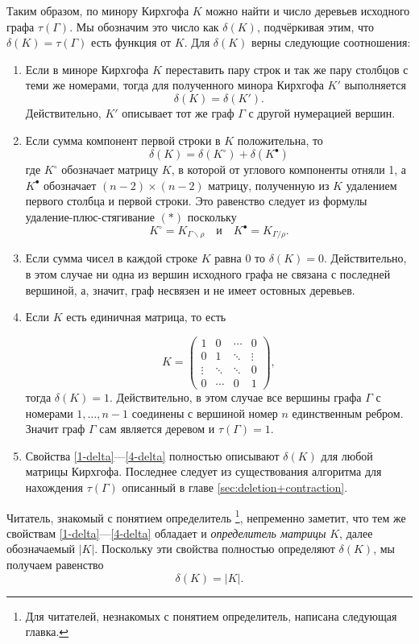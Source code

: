 \documentclass{article}
\begin{document}
Таким образом, по минору Кирхгофа $K$ можно найти и число деревьев исходного графа $\tau(\Gamma)$.
Мы обозначим это число как $\delta(K)$, подчёркивая этим, что $\delta(K)=\tau(\Gamma)$ есть функция от $K$.
Для $\delta(K)$ верны следующие соотношения:
\begin{enumerate}
\item\label{1-delta} Если в миноре Кирхгофа $K$ переставить пару строк и так же пару столбцов с теми же номерами,
тогда для полученного минора Кирхгофа $K'$ выполняется 
\[\delta(K)=\delta(K').\]
Действительно, $K'$ описывает тот же граф $\Gamma$ с другой нумерацией вершин.
\item\label{2-delta}
Если сумма компонент первой строки в $K$ положительна, то
\[\delta(K)=\delta(K^{\circ})+\delta(K^{\bullet})\]
где $K^{\circ}$ обозначает матрицу $K$, в которой от углового компоненты отняли 1, а $K^{\bullet}$ обозначает $(n-2)\times(n-2)$ матрицу, полученную из $K$ удалением первого столбца и первой строки.
Это равенство следует из формулы удаление-плюс-стягивание $({*})$ поскольку \[K^{\circ}=K_{\Gamma\backslash\rho}\quad\text{и}\quad K^{\bullet}=K_{\Gamma/\rho}.\]
\item Если сумма чисел в каждой строке $K$ равна $0$ то $\delta(K)=0$. 
Действительно, в этом случае ни одна из вершин исходного графа не связана с последней вершиной, а, значит, граф несвязен и не имеет остовных деревьев.

\item\label{4-delta} Если $K$ есть единичная матрица, то есть

\[
K=
\left(
\begin{matrix}
1&0&\cdots&0
\\
0&1&\ddots&\vdots
\\
\vdots&\ddots&\ddots&0
\\
0&\cdots&0&1
\end{matrix}
\right),
\]
тогда $\delta(K)=1$.
Действительно, в этом случае все вершины графа $\Gamma$ с номерами $1,
\dots,n-1$ соединены с вершиной номер $n$ единственным ребром.
Значит граф $\Gamma$ сам является деревом и $\tau(\Gamma)=1$.

\item Свойства \ref{1-delta}---\ref{4-delta} полностью описывают $\delta(K)$ для любой матрицы Кирхгофа.
Последнее следует из существования алгоритма для нахождения $\tau(\Gamma)$ описанный в главе  \ref{sec:deletion+contraction}.
\end{enumerate}

Читатель, знакомый с понятием определитель%
\footnote{Для читателей, незнакомых с понятием определитель, написана следующая главка.},
непременно заметит, что
тем же свойствам \ref{1-delta}---\ref{4-delta} обладает и \emph{определитель матрицы} $K$, далее обозначаемый $|K|$.
Поскольку эти свойства полностью определяют $\delta(K)$, мы получаем равенство
\[\delta(K)=| K|.\]
\end{document}
